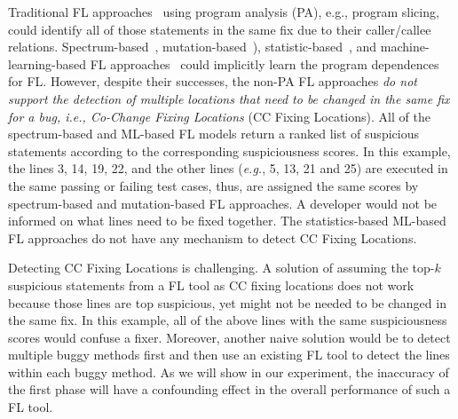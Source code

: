 Traditional FL approaches~\cite{zhang-fse09,ICICA-10} using program
analysis (PA), e.g., program slicing, could identify all of those
statements in the same fix due to their caller/callee
relations. Spectrum-based~\cite{tarantula05,Ochiai},
mutation-based~\cite{MUSE,papadakis2012using,Metallaxis}),
statistic-based~\cite{liblit-pldi05}, and machine-learning-based FL
approaches~\cite{DeepFL,icse21-fl} could implicitly learn the program
dependences for FL. However, despite their successes, the non-PA FL
approaches {\em do not support the detection of multiple locations
  that need to be changed in the same fix for a bug, i.e., Co-Change
  Fixing Locations} (CC Fixing Locations).
%
All of the spectrum-based and ML-based FL models return a ranked list
of suspicious statements according to the corresponding suspiciousness
scores. In this example, the lines 3, 14, 19, 22, and the other lines
({\em e.g.}, 5, 13, 21 and 25) are executed in the same passing or
failing test cases, thus, are assigned the same scores by
spectrum-based and mutation-based FL approaches. A developer would not
be informed on what lines need to be fixed together. The
statistics-based ML-based FL approaches do not have any mechanism to
detect CC Fixing Locations.

Detecting CC Fixing Locations is challenging. A solution of assuming
the top-$k$ suspicious statements from a FL tool as CC fixing
locations does not work because those lines are top suspicious, yet
might not be needed to be changed in the same fix. In this example,
all of the above lines with the same suspiciousness scores would
confuse a fixer. Moreover, another naive solution would be to
detect multiple buggy methods first and then use an existing FL tool
to detect the lines within each buggy method. As we will show in our
experiment, the inaccuracy of the first phase will have a confounding
effect in the overall performance of such a FL tool.


